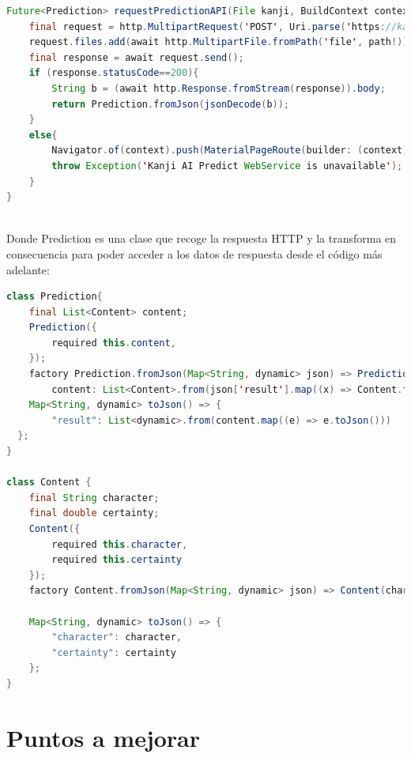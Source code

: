 \documentclass{article}
\begin{document}
\noindent\begin{minipage}{\textwidth}
\begin{lstlisting}[language=java]
Future<Prediction> requestPredictionAPI(File kanji, BuildContext context) async{
	final request = http.MultipartRequest('POST', Uri.parse('https://kanji.otterleek.com/'));
	request.files.add(await http.MultipartFile.fromPath('file', path!));
	final response = await request.send();
	if (response.statusCode==200){
    	String b = (await http.Response.fromStream(response)).body;
    	return Prediction.fromJson(jsonDecode(b));
	}
	else{
    	Navigator.of(context).push(MaterialPageRoute(builder: (context) => Unavailable()));
    	throw Exception('Kanji AI Predict WebService is unavailable');
	}
}
\end{lstlisting}
\end{minipage}\\

Donde Prediction es una clase que recoge la respuesta HTTP y la transforma en consecuencia para poder acceder a los datos de respuesta desde el código más adelante:

\noindent\begin{minipage}{\textwidth}
\begin{lstlisting}[language=java]
class Prediction{
	final List<Content> content;
	Prediction({
    	required this.content,
	});
	factory Prediction.fromJson(Map<String, dynamic> json) => Prediction(
    	content: List<Content>.from(json['result'].map((x) => Content.fromJson(x))));
	Map<String, dynamic> toJson() => {
    	"result": List<dynamic>.from(content.map((e) => e.toJson()))
  };
}

class Content {
	final String character;
	final double certainty;
	Content({
    	required this.character,
    	required this.certainty
	});
	factory Content.fromJson(Map<String, dynamic> json) => Content(character: json['character'], certainty: json['confidence']);
 
	Map<String, dynamic> toJson() => {
    	"character": character,
    	"certainty": certainty
	};
}
\end{lstlisting}
\end{minipage}




\newpage

\section{Puntos a mejorar}
\label{sec:Improvements}
\end{document}
